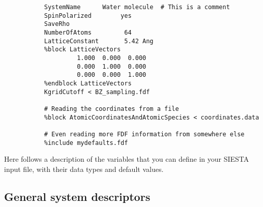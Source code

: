 \begin{verbatim}
           SystemName      Water molecule  # This is a comment 
           SpinPolarized        yes 
           SaveRho                 
           NumberOfAtoms         64  
           LatticeConstant       5.42 Ang  
           %block LatticeVectors  
                    1.000  0.000  0.000 
                    0.000  1.000  0.000 
                    0.000  0.000  1.000
           %endblock LatticeVectors  
           KgridCutoff < BZ_sampling.fdf 

           # Reading the coordinates from a file 
           %block AtomicCoordinatesAndAtomicSpecies < coordinates.data 

           # Even reading more FDF information from somewhere else
           %include mydefaults.fdf  
\end{verbatim}

Here follows a description of the variables that you can
define in your SIESTA input file, with their data types and
default values.

\vspace{5pt}
\subsection{General system descriptors}

